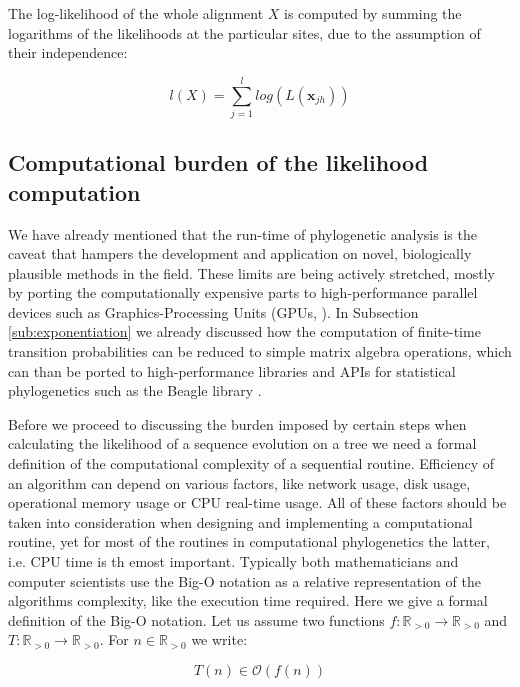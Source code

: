\documentclass[12pt,twoside]{mitthesis}
\theoremstyle{plain}
\theoremstyle{definition}
\theoremstyle{remark}
\begin{document}
\noindent
The log-likelihood of the whole alignment $X$ is computed by summing the logarithms of the likelihoods at the particular sites, due to the assumption of their independence:

\begin{equation}
l(X)=\underset{j=1}{\overset{l}{\sum}}log\left(L(\mathbf{x}_{jh})\right)
\label{eq:loglikelihood}
\end{equation}

\subsection{Computational burden of the likelihood computation}

We have already mentioned that the run-time of phylogenetic analysis is the caveat that hampers the development and application on novel, biologically plausible methods in the field.
These limits are being actively stretched, mostly by porting the computationally expensive parts to high-performance parallel devices such as Graphics-Processing Units (GPUs, \cite{Nickolls2008}).
In Subsection \ref{sub:exponentiation} we already discussed how the computation of finite-time transition probabilities can be reduced to simple matrix algebra operations, which can than be ported to high-performance libraries and APIs for statistical phylogenetics such as the Beagle library \citep{ Ayres2012, Suchard2009}. 

Before we proceed to discussing the burden imposed by certain steps when calculating the likelihood of a sequence evolution on a tree we need a formal definition of the computational complexity of a sequential routine.
Efficiency of an algorithm can depend on various factors, like network usage, disk usage, operational memory usage or CPU real-time usage.
All of these factors should be taken into consideration when designing and implementing a computational routine, yet for most of the routines in computational phylogenetics the latter, i.e. CPU time is th emost important.
Typically both mathematicians and computer scientists use the Big-O notation as a relative representation of the algorithms complexity, like the execution time required.
Here we give a formal definition of the Big-O notation.
Let us assume two functions $f:\mathbb{R}_{>0}\rightarrow\mathbb{R}_{>0}$ and $T:\mathbb{R}_{>0}\rightarrow\mathbb{R}_{>0}$. 
For $n \in \mathbb{R}_{>0}$ we write:

\begin{equation}
T(n) \in \mathcal{O}\left(f(n)\right)
\label{eq:bigOh}
\end{equation}
\end{document}
